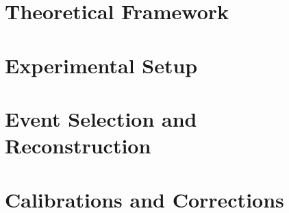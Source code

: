\documentclass[12pt,a4paper,reqno,twoside,final]{scrbook}%
\numberwithin{equation}{subsection}
\begin{document}
 \chapter{Theoretical Framework}
 \label{ch:theory}
 

 \chapter{Experimental Setup}
 \label{ch:expsetup}
 

 \chapter{Event Selection and Reconstruction}
 \label{ch:selectionreco}
 

 \chapter{Calibrations and Corrections}
 \label{ch:calibcorr}
 

\end{document}
